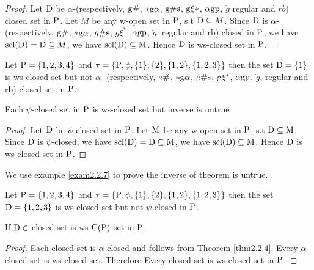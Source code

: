 \begin{proof}
Let $\mathrm{D}$ be $\alpha$-(respectively, $\mathrm{g}\#$, $*\mathrm{g}\alpha$, $\mathrm{g}\# \mathrm{s}$, $\mathrm{g}\xi*$, $\alpha\mathrm{g}\mathrm{p}$, $\ddot{g}$ regular and $rb$) closed set in $\mathrm{P}$. Let $M$ be any w-open set in $\mathrm{P}$, s.t $\mathrm{D} \subseteq M$. Since $\mathrm{D}$ is $\alpha$- (respectively, $\mathrm{g}\#$, $*\mathrm{g}\alpha$, $g\# \mathrm{s}$, $g\xi^{*}$, $\alpha\mathrm{g}\mathrm{p}$, $\ddot{g}$, regular and rb) closed in $\mathrm{P}$, we have $\mathrm{scl}(\mathrm{D}) = \mathrm{D} \subseteq M$, we have $\mathrm{scl}(\mathrm{D}) \subseteq \mathrm{M}$. Hence $\mathrm{D}$ is ws-closed set in $\mathrm{P}$.
\end{proof}

\begin{exm}\label{exam2.2.5}
Let $\mathrm{P}= \{1, 2, 3, 4\}$ and $\tau=\{\mathrm{P}, \phi, \{1\}, \{2\},\{1, 2\}, \{1, 2, 3\}\}$ then the set $\mathrm{D}=\{1\}$ is ws-closed set but not $\alpha$- (respectively, $\mathrm{g}\#$, $*\mathrm{g}\alpha$, $\mathrm{g}\# \mathrm{s}$, $\mathrm{g}\xi^{*}$, $\alpha\mathrm{g}\mathrm{p}$, $\ddot{g}$, regular and rb) closed set in $\mathrm{P}$.
\end{exm}

\begin{thm}\label{thm2.2.6}
Each $\psi$-closed set in $\mathrm{P}$ is ws-closed set but inverse is untrue
\end{thm}

\begin{proof}
Let $\mathrm{D}$ be $\psi$-closed set in $\mathrm{P}$. Let $\mathrm{M}$ be any w-open set in $\mathrm{P}$, s.t $\mathrm{D}\subseteq \mathrm{M}$. Since $\mathrm{D}$ is $\psi$-closed, we have $\mathrm{scl}(\mathrm{D})=\mathrm{D}\subseteq \mathrm{M}$, we have $\mathrm{scl}(\mathrm{D})\subseteq \mathrm{M}$. Hence $\mathrm{D}$ is ws-closed set in $\mathrm{P}$.
\end{proof}

We use example \ref{exam2.2.7} to prove the inverse of theorem is untrue.

\begin{exm}\label{exam2.2.7}
Let $\mathrm{P}= \{1, 2, 3, 4\}$ and  $\tau= \{\mathrm{P}, \phi, \{1\}, \{2\},\{1, 2\}, \{1, 2, 3\}\}$ then the set $\mathrm{D}= \{1,2,3\}$ is ws-closed set but not $\psi$-closed in $\mathrm{P}$.
\end{exm}

\begin{coro}\label{coro2.2.8}
If $\mathrm{D}\in$ closed set is ws-$\mathrm{C}(\mathrm{P})$ set in $\mathrm{P}$.
\end{coro}

\begin{proof}
Each closed set is $\alpha$-closed and follows from Theorem \ref{thm2.2.4}. Every $\alpha$-closed set is ws-closed set. Therefore Every closed set is ws-closed set in $\mathrm{P}$.
\end{proof}

